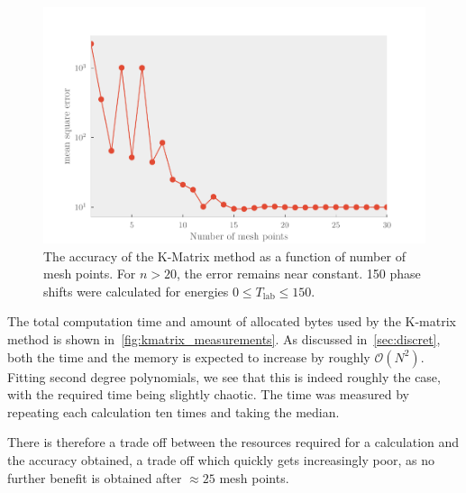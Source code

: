 \begin{figure}[ht!]
  \centering
  \includegraphics[]{Figures/kmatrix_accuracy}
  \caption{\label{fig:kmatrix_accuracy}The accuracy of the K-Matrix method as a
  function of number of mesh points. For \(n>20\), the error remains near
  constant. 150 phase shifts were calculated for energies \(0\le T_{\text{lab}} \le 150\).}
\end{figure}

The total computation time and amount of allocated bytes used by the K-matrix
method is shown in~\cref{fig:kmatrix_measurements}. As discussed
in~\cref{sec:discret}, both the time and the memory is expected to increase by roughly
\(\mathcal{O}(N^{2})\). Fitting second degree polynomials, we see that this is
indeed roughly the case, with the required time being slightly chaotic. The
time was measured by repeating each calculation ten times and taking the median.

There is therefore a trade off between the resources required for a calculation
and the accuracy obtained, a trade off which quickly gets increasingly poor,
as no further benefit is obtained after \(\approx 25\) mesh points.

